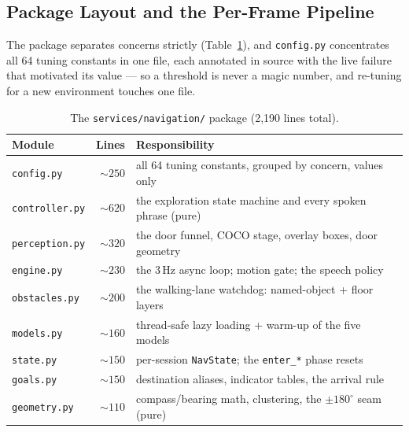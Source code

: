 \subsection{Package Layout and the Per-Frame Pipeline}

The package separates concerns strictly (Table~\ref{tab:nav_modules}), and
\texttt{config.py} concentrates all 64 tuning constants in one file, each
annotated in source with the live failure that motivated its value --- so a
threshold is never a magic number, and re-tuning for a new environment touches
one file.

\begin{table}[!htbp]
\centering
\caption[Navigation package layout]{The \texttt{services/navigation/} package (2{,}190 lines total).}
\label{tab:nav_modules}
\small
\begin{tabular}{l r p{8.0cm}}
\toprule
\textbf{Module} & \textbf{Lines} & \textbf{Responsibility} \\
\midrule
\texttt{config.py}     & ${\sim}250$ & all 64 tuning constants, grouped by concern, values only \\
\texttt{controller.py} & ${\sim}620$ & the exploration state machine and every spoken phrase (pure) \\
\texttt{perception.py} & ${\sim}320$ & the door funnel, COCO stage, overlay boxes, door geometry \\
\texttt{engine.py}     & ${\sim}230$ & the 3\,Hz async loop; motion gate; the speech policy \\
\texttt{obstacles.py}  & ${\sim}200$ & the walking-lane watchdog: named-object + floor layers \\
\texttt{models.py}     & ${\sim}160$ & thread-safe lazy loading + warm-up of the five models \\
\texttt{state.py}      & ${\sim}150$ & per-session \texttt{NavState}; the \texttt{enter\_*} phase resets \\
\texttt{goals.py}      & ${\sim}150$ & destination aliases, indicator tables, the arrival rule \\
\texttt{geometry.py}   & ${\sim}110$ & compass/bearing math, clustering, the $\pm180^\circ$ seam (pure) \\
\bottomrule
\end{tabular}
\end{table}

